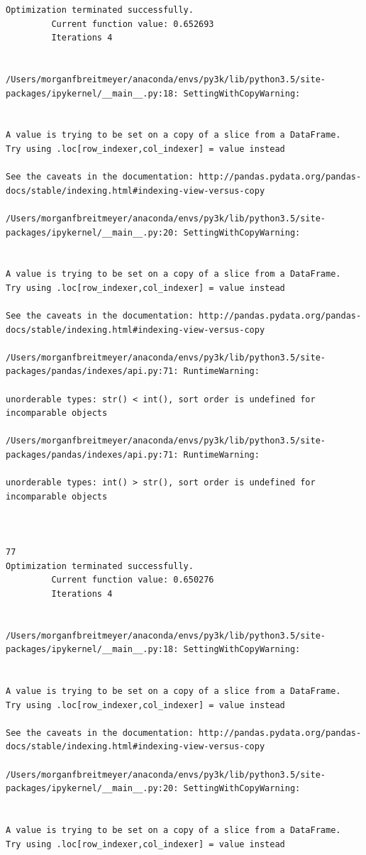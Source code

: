 \begin{lstlisting}
Optimization terminated successfully.
         Current function value: 0.652693
         Iterations 4


/Users/morganfbreitmeyer/anaconda/envs/py3k/lib/python3.5/site-packages/ipykernel/__main__.py:18: SettingWithCopyWarning:


A value is trying to be set on a copy of a slice from a DataFrame.
Try using .loc[row_indexer,col_indexer] = value instead

See the caveats in the documentation: http://pandas.pydata.org/pandas-docs/stable/indexing.html#indexing-view-versus-copy

/Users/morganfbreitmeyer/anaconda/envs/py3k/lib/python3.5/site-packages/ipykernel/__main__.py:20: SettingWithCopyWarning:


A value is trying to be set on a copy of a slice from a DataFrame.
Try using .loc[row_indexer,col_indexer] = value instead

See the caveats in the documentation: http://pandas.pydata.org/pandas-docs/stable/indexing.html#indexing-view-versus-copy

/Users/morganfbreitmeyer/anaconda/envs/py3k/lib/python3.5/site-packages/pandas/indexes/api.py:71: RuntimeWarning:

unorderable types: str() < int(), sort order is undefined for incomparable objects

/Users/morganfbreitmeyer/anaconda/envs/py3k/lib/python3.5/site-packages/pandas/indexes/api.py:71: RuntimeWarning:

unorderable types: int() > str(), sort order is undefined for incomparable objects



77
Optimization terminated successfully.
         Current function value: 0.650276
         Iterations 4


/Users/morganfbreitmeyer/anaconda/envs/py3k/lib/python3.5/site-packages/ipykernel/__main__.py:18: SettingWithCopyWarning:


A value is trying to be set on a copy of a slice from a DataFrame.
Try using .loc[row_indexer,col_indexer] = value instead

See the caveats in the documentation: http://pandas.pydata.org/pandas-docs/stable/indexing.html#indexing-view-versus-copy

/Users/morganfbreitmeyer/anaconda/envs/py3k/lib/python3.5/site-packages/ipykernel/__main__.py:20: SettingWithCopyWarning:


A value is trying to be set on a copy of a slice from a DataFrame.
Try using .loc[row_indexer,col_indexer] = value instead


\end{lstlisting}
